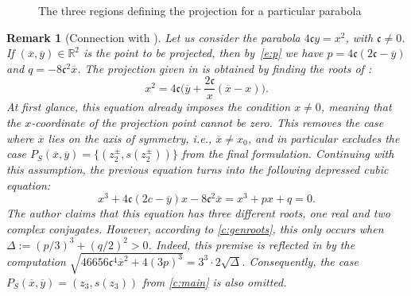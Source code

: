 \documentclass[11pt]{article}
\newcommand{\RR}{\ensuremath{\mathbb R}}
\newtheorem{remark}[theorem]{Remark}
\providecommand{\RR}{\mathbb{R}}
\providecommand{\RR}{\mathbb{R}}
\newcommand{\px}{\overline{x}}
\newcommand{\py}{\overline{y}}
\begin{document}
\begin{figure}[ht]
\caption{The three regions defining the projection for a particular parabola}
\label{fig:regions}
\end{figure}

\begin{remark}[Connection with \cite{chou}]\label{remark}
    Let us consider the parabola $4\mathfrak{c}y=x^2$, with $\mathfrak{c}\neq0$. If $(\px,\py)\in\RR^2$ is the point to be projected, then by~\cref{e:p} we have $p=4\mathfrak{c}(2\mathfrak{c}-\py)$ and $q=-8\mathfrak{c}^2\px$. The projection given in \cite[Equation (5)]{chou} is obtained by finding the roots of \cite[Equation (4)]{chou}:
    \[x^2=4\mathfrak{c}\Big(\py+\frac{2\mathfrak{c}}{x}(\px-x)\Big).\]
    At first glance, this equation already imposes the condition $x\neq0$, meaning that the $x$-coordinate of the projection point cannot be zero. This removes the case where $\px$ lies on the axis of symmetry, i.e., $\px\neq x_0$, and in particular excludes the case $P_S(\px,\py)=\{(z_2^\pm,s(z_2^\pm))\}$ from the final formulation. Continuing with this assumption, the previous equation turns into the following depressed cubic equation:
    \[x^3+4\mathfrak{c}(2c-\py)x-8\mathfrak{c}^2\px=x^3+px+q=0.\]
    The author claims that this equation has three different roots, one real and two complex conjugates. However, according to \cref{c:genroots}, this only occurs when $\Delta:=(p/3)^3+(q/2)^2>0$. Indeed, this premise is reflected in \cite[Equation (5)]{chou} by the computation $\sqrt{46656\mathfrak{c}^4\px^2+4(3p)^3}=3^3\cdot 2\sqrt{\Delta}$. Consequently, the case $P_S(\px,\py)=(z_3,s(z_3))$ from \cref{c:main} is also omitted.
\end{remark}
\end{document}
